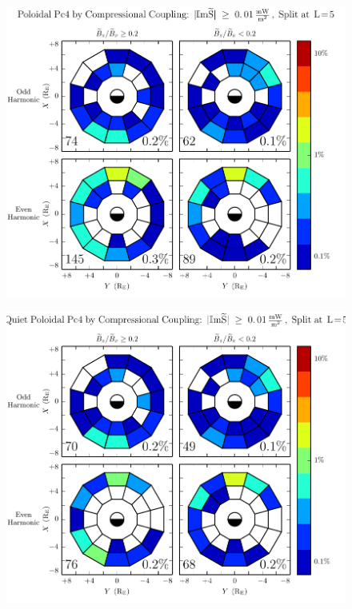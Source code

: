 \begin{figure}[!htb]
    \centering
    \includegraphics[width=\textwidth]{figures/azm_rate_all.pdf}
    \caption[Poloidal Pc4 Rate by Compressional Coupling]{
    }
    \label{fig_azm_rate_all}
\end{figure}


\begin{figure}[!htb]
    \centering
    \includegraphics[width=\textwidth]{figures/azm_rate_calm.pdf}
    \caption[Poloidal Pc4 Rate by Compressional Coupling: Dst$\geq \SI{-30}{\nT}$]{
      \todo{$\cdots$}
    }
    \label{fig_azm_rate_calm}
\end{figure}


